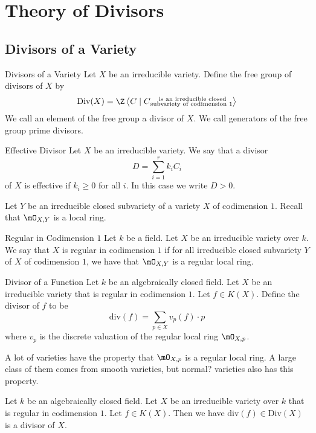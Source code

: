 \documentclass[a4paper]{article}
\begin{document}
\pagebreak
\section{Theory of Divisors}
\subsection{Divisors of a Variety}
\begin{defn}{Divisors of a Variety}{} Let $X$ be an irreducible variety. Define the free group of divisors of $X$ by $$\text{Div}(X)=\Z\left\langle C\;|\;C\substack{\text{ is an irreducible closed}\\\text{subvariety of codimension }1}\right\rangle$$ We call an element of the free group a divisor of $X$. We call generators of the free group prime divisors. 
\end{defn}

\begin{defn}{Effective Divisor}{} Let $X$ be an irreducible variety. We say that a divisor $$D=\sum_{i=1}^rk_iC_i$$ of $X$ is effective if $k_i\geq 0$ for all $i$. In this case we write $D>0$. 
\end{defn}

Let $Y$ be an irreducible closed subvariety of a variety $X$ of codimension $1$. Recall that $\mO_{X,Y}$ is a local ring. 

\begin{defn}{Regular in Codimension $1$}{} Let $k$ be a field. Let $X$ be an irreducible variety over $k$. We say that $X$ is regular in codimension $1$ if for all irreducible closed subvariety $Y$ of $X$ of codimension $1$, we have that $\mO_{X,Y}$ is a regular local ring. 
\end{defn}

\begin{defn}{Divisor of a Function}{} Let $k$ be an algebraically closed field. Let $X$ be an irreducible variety that is regular in codimension $1$. Let $f\in K(X)$. Define the divisor of $f$ to be $$\text{div}(f)=\sum_{p\in X}v_p(f)\cdot p$$ where $v_p$ is the discrete valuation of the regular local ring $\mO_{X,p}$. 
\end{defn}

A lot of varieties have the property that $\mO_{X,p}$ is a regular local ring. A large class of them comes from smooth varieties, but normal? varieties also has this property. 

\begin{lmm}{}{} Let $k$ be an algebraically closed field. Let $X$ be an irreducible variety over $k$ that is regular in codimension $1$. Let $f\in K(X)$. Then we have $\text{div}(f)\in\text{Div}(X)$ is a divisor of $X$. 
\end{lmm}
\end{document}
